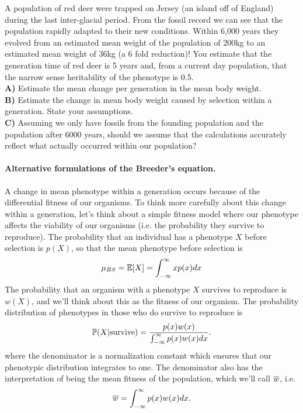 \begin{question}
A population of red deer were trapped on Jersey (an island off of
England) during the last inter-glacial period. From the fossil record \cite{lister:89}
we can see that the population rapidly adapted to their new
conditions. Within 6,000 years they evolved from an estimated mean weight of
the population of 200kg to an estimated mean weight of 36kg (a 6 fold
reduction)! You estimate that the generation time
of red deer is 5 years and, from a current day population, that the narrow sense heritability of the
phenotype is 0.5.\\
{\bf A)}	Estimate the mean change per generation in the mean body weight. \\

{\bf B)}	Estimate the change in mean body weight caused by
selection within a generation. State your assumptions.\\

{\bf C)}	Assuming we only have fossils from the founding population and the population after 6000 years, should we assume that the calculations accurately reflect what actually occurred within our population?
\end{question}


\paragraph{Alternative formulations of the Breeder's equation.}
A change in mean phenotype within a generation occurs because of the
differential fitness of our organisms. To think more carefully about this change within a
generation, let's think about a simple fitness model where our phenotype affects the
viability of our organisms (i.e. the probability they survive to
reproduce). The probability that an individual has a phenotype $X$
before selection is $p(X)$, so that the mean phenotype before
selection is
\begin{equation}
\mu_{BS} = \E[X] =  \int_{-\infty}^{\infty} x p(x) dx
\end{equation}
The probability that an organism with a phenotype $X$ survives to
reproduce is $w(X)$, and we'll think about this as the fitness of
our organism. The probability distribution of phenotypes in those who
do survive to reproduce is
\begin{equation}
\P(X | \textrm{survive}) =  \frac{p(x) w(x)}{
\int_{-\infty}^{\infty} p(x) w(x) dx}.
\end{equation}
where the denominator is a normalization constant which ensures that
our phenotypic distribution integrates to one. The denominator also
has the interpretation of being the mean fitness of the population,
which we'll call $\wbar$, i.e.  
\begin{equation}
\wbar =  
\int_{-\infty}^{\infty} p(x) w(x) dx.
\end{equation}


